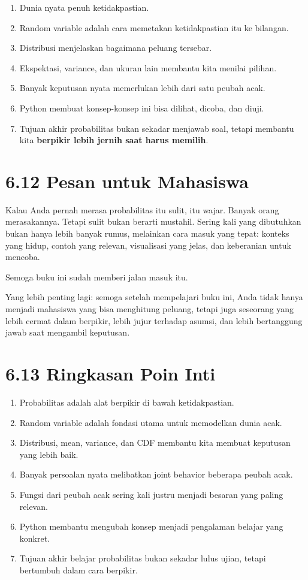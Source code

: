 \documentclass[
  letterpaper,
  DIV=11,
  numbers=noendperiod]{scrreprt}
\providecommand{\tightlist}{%
  \setlength{\itemsep}{0pt}\setlength{\parskip}{0pt}}
\begin{document}
\begin{enumerate}
\def\labelenumi{\arabic{enumi}.}
\tightlist
\item
  Dunia nyata penuh ketidakpastian.
\item
  Random variable adalah cara memetakan ketidakpastian itu ke bilangan.
\item
  Distribusi menjelaskan bagaimana peluang tersebar.
\item
  Ekspektasi, variance, dan ukuran lain membantu kita menilai pilihan.
\item
  Banyak keputusan nyata memerlukan lebih dari satu peubah acak.
\item
  Python membuat konsep-konsep ini bisa dilihat, dicoba, dan diuji.
\item
  Tujuan akhir probabilitas bukan sekadar menjawab soal, tetapi membantu
  kita \textbf{berpikir lebih jernih saat harus memilih}.
\end{enumerate}

\section{6.12 Pesan untuk Mahasiswa}\label{pesan-untuk-mahasiswa}

Kalau Anda pernah merasa probabilitas itu sulit, itu wajar. Banyak orang
merasakannya. Tetapi sulit bukan berarti mustahil. Sering kali yang
dibutuhkan bukan hanya lebih banyak rumus, melainkan cara masuk yang
tepat: konteks yang hidup, contoh yang relevan, visualisasi yang jelas,
dan keberanian untuk mencoba.

Semoga buku ini sudah memberi jalan masuk itu.

Yang lebih penting lagi: semoga setelah mempelajari buku ini, Anda tidak
hanya menjadi mahasiswa yang bisa menghitung peluang, tetapi juga
seseorang yang lebih cermat dalam berpikir, lebih jujur terhadap asumsi,
dan lebih bertanggung jawab saat mengambil keputusan.

\section{6.13 Ringkasan Poin Inti}\label{ringkasan-poin-inti-5}

\begin{enumerate}
\def\labelenumi{\arabic{enumi}.}
\tightlist
\item
  Probabilitas adalah alat berpikir di bawah ketidakpastian.
\item
  Random variable adalah fondasi utama untuk memodelkan dunia acak.
\item
  Distribusi, mean, variance, dan CDF membantu kita membuat keputusan
  yang lebih baik.
\item
  Banyak persoalan nyata melibatkan joint behavior beberapa peubah acak.
\item
  Fungsi dari peubah acak sering kali justru menjadi besaran yang paling
  relevan.
\item
  Python membantu mengubah konsep menjadi pengalaman belajar yang
  konkret.
\item
  Tujuan akhir belajar probabilitas bukan sekadar lulus ujian, tetapi
  bertumbuh dalam cara berpikir.
\end{enumerate}
\end{document}
